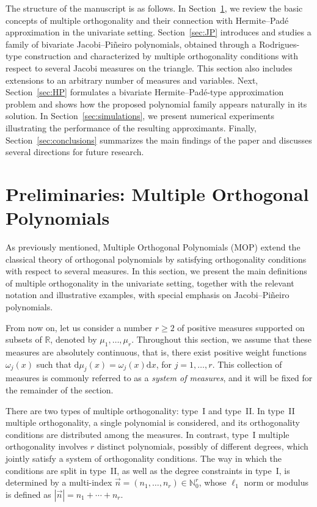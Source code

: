 \documentclass[11pt,reqno]{amsart}
\newcommand{\NN}{\mathbb{N}}
\newcommand{\RR}{\mathbb{R}}
\newcommand{\dr}{\mathrm{d}}
\theoremstyle{definition}
\begin{document}
The structure of the manuscript is as follows. In Section~\ref{sec:preliminaries}, we review the basic concepts of multiple orthogonality and their connection with Hermite--Padé approximation in the univariate setting. Section~\ref{sec:JP} introduces and studies a family of bivariate Jacobi--Piñeiro polynomials, obtained through a Rodrigues-type construction and characterized by multiple orthogonality conditions with respect to several Jacobi measures on the triangle. This section also includes extensions to an arbitrary number of measures and variables. Next, Section~\ref{sec:HP} formulates a bivariate Hermite--Padé-type approximation problem and shows how the proposed polynomial family appears naturally in its solution. In Section~\ref{sec:simulations}, we present numerical experiments illustrating the performance of the resulting approximants. Finally, Section~\ref{sec:conclusions} summarizes the main findings of the paper and discusses several directions for future research.

\section{Preliminaries: Multiple Orthogonal Polynomials}\label{sec:preliminaries}

As previously mentioned, Multiple Orthogonal Polynomials (MOP) extend the classical theory of orthogonal polynomials by satisfying orthogonality conditions with respect to several measures. In this section, we present the main definitions of multiple orthogonality in the univariate setting, together with the relevant notation and illustrative examples, with special emphasis on Jacobi--Piñeiro polynomials.

From now on, let us consider a number $r\geq 2$ of positive measures supported on subsets of $\RR$, denoted by $\mu_1,\dots,\mu_r$. Throughout this section, we assume that these measures are absolutely continuous, that is, there exist positive weight functions $\omega_j(x)$ such that $\dr\mu_j(x)=\omega_j(x)\dr x$, for $j=1,\dots,r$. This collection of measures is commonly referred to as a \emph{system of measures}, and it will be fixed for the remainder of the section.

There are two types of multiple orthogonality: type~I and type~II. In type~II multiple orthogonality, a single polynomial is considered, and its orthogonality conditions are distributed among the measures. In contrast, type~I multiple orthogonality involves $r$ distinct polynomials, possibly of different degrees, which jointly satisfy a system of orthogonality conditions. The way in which the conditions are split in type~II, as well as the degree constraints in type~I, is determined by a multi-index $\vec n=(n_1,\dots,n_r)\in\NN_0^r$, whose $\ell_1$ norm or modulus is defined as $|\vec n|=n_1+\cdots+n_r$.
\end{document}
